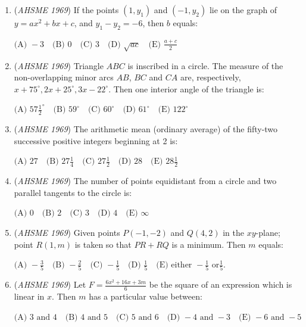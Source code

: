 \begin{enumerate}
 $\text{(A) } \frac{5}{\sqrt{2}}\quad \text{(B) } 5\quad \text{(C) } 5\sqrt{2}\quad \text{(D) } 10\quad \text{(E) } 10\sqrt{2}$


	\item (\textit{AHSME 1969}) If the points $(1,y_1)$ and $(-1,y_2)$ lie on the graph of $y=ax^2+bx+c$, and $y_1-y_2=-6$, then $b$ equals:


 $\text{(A) } -3\quad \text{(B) } 0\quad \text{(C) } 3\quad \text{(D) } \sqrt{ac}\quad \text{(E) } \frac{a+c}{2}$


	\item (\textit{AHSME 1969}) Triangle $ABC$ is inscribed in a circle. The measure of the non-overlapping minor arcs $AB$, $BC$ and $CA$ are, respectively, $x+75^{\circ} , 2x+25^{\circ},3x-22^{\circ}$. Then one interior angle of the triangle is:


 $\text{(A) } 57\frac{1}{2}^{\circ}\quad \text{(B) } 59^{\circ}\quad \text{(C) } 60^{\circ}\quad \text{(D) } 61^{\circ}\quad \text{(E) } 122^{\circ}$


	\item (\textit{AHSME 1969}) The arithmetic mean (ordinary average) of the fifty-two successive positive integers beginning at 2 is:


 $\text{(A) } 27\quad \text{(B) } 27\frac{1}{4}\quad \text{(C) } 27\frac{1}{2}\quad \text{(D) } 28\quad \text{(E) } 28\frac{1}{2}$


	\item (\textit{AHSME 1969}) The number of points equidistant from a circle and two parallel tangents to the circle is:


 $\text{(A) } 0\quad \text{(B) } 2\quad \text{(C) } 3\quad \text{(D) } 4\quad \text{(E) } \infty$


	\item (\textit{AHSME 1969}) Given points $P(-1,-2)$ and $Q(4,2)$ in the $xy$-plane; point $R(1,m)$ is taken so that $PR+RQ$ is a minimum. Then $m$ equals:


 $\text{(A) } -\frac{3}{5}\quad \text{(B) } -\frac{2}{5}\quad \text{(C) } -\frac{1}{5}\quad \text{(D) } \frac{1}{5}\quad \text{(E) either }-\frac{1}{5}\text{ or} \frac{1}{5}.$


	\item (\textit{AHSME 1969}) Let $F=\frac{6x^2+16x+3m}{6}$ be the square of an expression which is linear in $x$. Then $m$ has a particular value between:


 $\text{(A) } 3 \text{ and } 4\quad \text{(B) } 4 \text{ and } 5\quad \text{(C) } 5 \text{ and } 6\quad \text{(D) } -4 \text{ and } -3\quad \text{(E) } -6 \text{ and } -5$



\end{enumerate}
